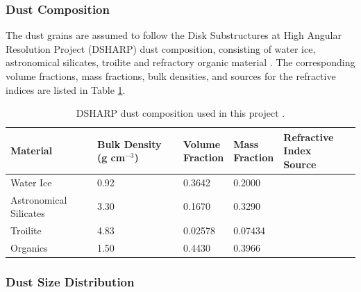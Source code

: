\subsubsection{Dust Composition}
The dust grains are assumed to follow the Disk Substructures at High Angular Resolution Project (DSHARP) dust composition, consisting of water ice, astronomical silicates, troilite and refractory organic material \citep{dsharp_code}. The corresponding volume fractions, mass fractions, bulk densities, and sources for the refractive indices are listed in Table \ref{tab: dsharp_composition}. 




\begin{table}[h!]
\centering
\caption{DSHARP dust composition used in this project \cite{dsharp_code}.}

\begin{tabular}{lllll}
\toprule
\textbf{Material} &
\shortstack[l]{\textbf{Bulk Density}\\\textbf{(g cm$^{-3}$)}} &
\shortstack[l]{\textbf{Volume}\\\textbf{Fraction}} &
\shortstack[l]{\textbf{Mass}\\\textbf{Fraction}} &
\shortstack[l]{\textbf{Refractive Index}\\\textbf{Source}} \\
\midrule
Water Ice
& 0.92
& 0.3642
& 0.2000
& \cite{Warren_and_Brandt} \\

Astronomical Silicates
& 3.30
& 0.1670
& 0.3290
& \cite{Draine} \\

Troilite
& 4.83
& 0.02578
& 0.07434
& \cite{Henning_and_Stog} \\

Organics
& 1.50
& 0.4430
& 0.3966
& \cite{Henning_and_Stog} \\

\bottomrule
\end{tabular}
\label{tab: dsharp_composition}
\end{table}



\subsubsection{Dust Size Distribution}


